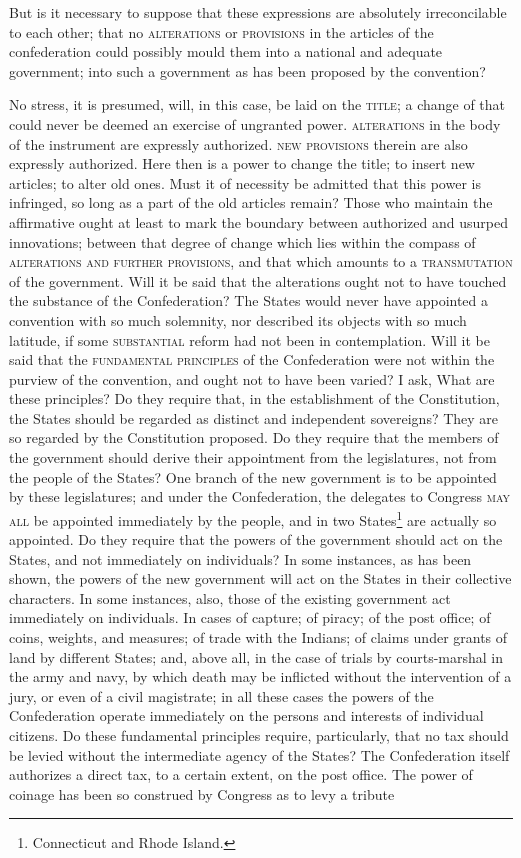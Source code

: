 But is it necessary to suppose that these expressions are absolutely irreconcilable to each other; that no \textsc{alterations }or \textsc{provisions }in the articles of the confederation could possibly mould them into a national and adequate government; into such a government as has been proposed by the convention?

No stress, it is presumed, will, in this case, be laid on the \textsc{title}; a change of that could never be deemed an exercise of ungranted power. \textsc{alterations }in the body of the instrument are expressly authorized. \textsc{new provisions }therein are also expressly authorized. Here then is a power to change the title; to insert new articles; to alter old ones. Must it of necessity be admitted that this power is infringed, so long as a part of the old articles remain? Those who maintain the affirmative ought at least to mark the boundary between authorized and usurped innovations; between that degree of change which lies within the compass of \textsc{alterations and further provisions}, and that which amounts to a \textsc{transmutation }of the government. Will it be said that the alterations ought not to have touched the substance of the Confederation? The States would never have appointed a convention with so much solemnity, nor described its objects with so much latitude, if some \textsc{substantial }reform had not been in contemplation. Will it be said that the \textsc{fundamental principles }of the Confederation were not within the purview of the convention, and ought not to have been varied? I ask, What are these principles? Do they require that, in the establishment of the Constitution, the States should be regarded as distinct and independent sovereigns? They are so regarded by the Constitution proposed. Do they require that the members of the government should derive their appointment from the legislatures, not from the people of the States? One branch of the new government is to be appointed by these legislatures; and under the Confederation, the delegates to Congress \textsc{may all }be appointed immediately by the people, and in two States\footnote{Connecticut and Rhode Island.} are actually so appointed. Do they require that the powers of the government should act on the States, and not immediately on individuals? In some instances, as has been shown, the powers of the new government will act on the States in their collective characters. In some instances, also, those of the existing government act immediately on individuals. In cases of capture; of piracy; of the post office; of coins, weights, and measures; of trade with the Indians; of claims under grants of land by different States; and, above all, in the case of trials by courts-marshal in the army and navy, by which death may be inflicted without the intervention of a jury, or even of a civil magistrate; in all these cases the powers of the Confederation operate immediately on the persons and interests of individual citizens. Do these fundamental principles require, particularly, that no tax should be levied without the intermediate agency of the States? The Confederation itself authorizes a direct tax, to a certain extent, on the post office. The power of coinage has been so construed by Congress as to levy a tribute 